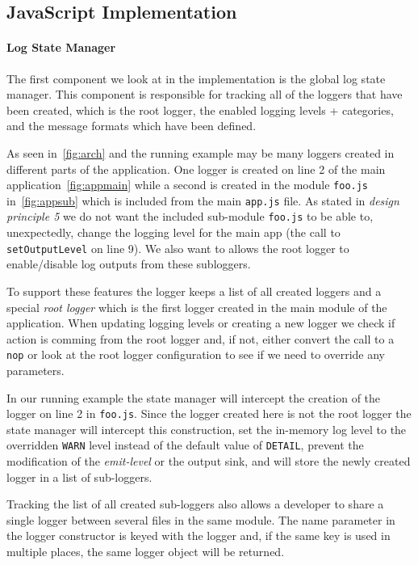 \subsection{JavaScript Implementation}
\paragraph{Log State Manager}
\noindent
The first component we look at in the implementation is the global log state 
manager. This component is responsible for tracking all of the loggers that 
have been created, which is the root logger, the enabled logging levels + 
categories, and the message formats which have been defined. 

As seen in~\autoref{fig:arch} and the running example may be many loggers 
created in different parts of the application. One logger is created on line 
2 of the main application~\autoref{fig:appmain} while a second is created 
in the module \texttt{foo.js} in~\autoref{fig:appsub} which is included from 
the main \texttt{app.js} file. As stated in \emph{design principle 5} we 
do not want the included sub-module \texttt{foo.js} to be able to, unexpectedly, 
change the logging level for the main app (the call to \texttt{setOutputLevel} on 
line 9). We also want to allows the root logger to enable/disable log outputs 
from these subloggers.

To support these features the \projn logger keeps a list of all created loggers 
and a special \emph{root logger} which is the first logger created in the main 
module of the application. When updating logging levels or creating a new logger 
we check if action is comming from the root logger and, if not, either convert 
the call to a \texttt{nop} or look at the root logger configuration to see if 
we need to override any parameters.

In our running example the state manager will intercept the creation of the logger 
on line 2 in \texttt{foo.js}. Since the logger created here is not the root logger
the state manager will intercept this construction, set the in-memory log level to 
the overridden \texttt{WARN} level instead of the default value of \texttt{DETAIL}, 
prevent the modification of the \emph{emit-level} or the output sink, and will 
store the newly created logger in a list of sub-loggers. 

Tracking the list of all created sub-loggers also allows a developer to share a 
single logger between several files in the same module. The name parameter in the 
logger constructor is keyed with the logger and, if the same key is used in multiple 
places, the same logger object will be returned.

